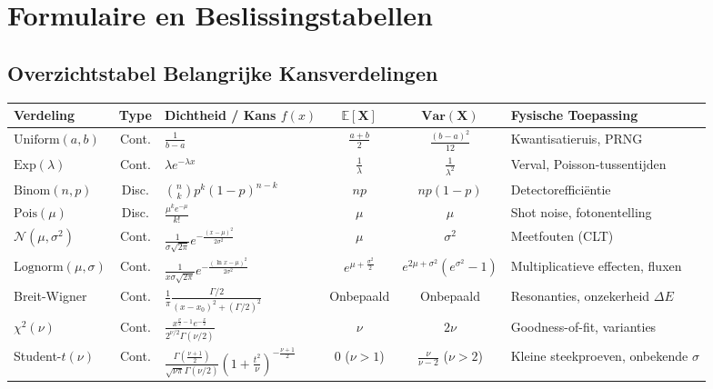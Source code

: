\documentclass[11pt,a4paper]{article}
\newcommand{\E}{\mathbb{E}}
\newcommand{\Var}{\text{Var}}
\newcommand{\normdist}{\mathcal{N}}
\begin{document}
\newpage
\appendix
\section{Formulaire en Beslissingstabellen}

\subsection{Overzichtstabel Belangrijke Kansverdelingen}
\begin{table}[H]
    \centering
    \footnotesize
    \begin{tabularx}{\textwidth}{lcp{3.8cm}ccX}
        \toprule
        \textbf{Verdeling} & \textbf{Type} & \textbf{Dichtheid / Kans $f(x)$} & $\mathbf{\E[X]}$ & $\mathbf{\Var(X)}$ & \textbf{Fysische Toepassing} \\
        \midrule
        $\text{Uniform}(a,b)$ & Cont. & $\frac{1}{b-a}$ & $\frac{a+b}{2}$ & $\frac{(b-a)^2}{12}$ & Kwantisatieruis, PRNG \\
        \addlinespace
        $\text{Exp}(\lambda)$ & Cont. & $\lambda e^{-\lambda x}$ & $\frac{1}{\lambda}$ & $\frac{1}{\lambda^2}$ & Verval, Poisson-tussentijden \\
        \addlinespace
        $\text{Binom}(n,p)$ & Disc. & $\binom{n}{k}p^k(1-p)^{n-k}$ & $np$ & $np(1-p)$ & Detectorefficiëntie \\
        \addlinespace
        $\text{Pois}(\mu)$ & Disc. & $\frac{\mu^k e^{-\mu}}{k!}$ & $\mu$ & $\mu$ & Shot noise, fotonentelling \\
        \addlinespace
        $\normdist(\mu,\sigma^2)$ & Cont. & $\frac{1}{\sigma\sqrt{2\pi}}e^{-\frac{(x-\mu)^2}{2\sigma^2}}$ & $\mu$ & $\sigma^2$ & Meetfouten (CLT) \\
        \addlinespace
        $\text{Lognorm}(\mu,\sigma)$ & Cont. & $\frac{1}{x\sigma\sqrt{2\pi}}e^{-\frac{(\ln x-\mu)^2}{2\sigma^2}}$ & $e^{\mu+\frac{\sigma^2}{2}}$ & $e^{2\mu+\sigma^2}(e^{\sigma^2}-1)$ & Multiplicatieve effecten, fluxen \\
        \addlinespace
        Breit-Wigner & Cont. & $\frac{1}{\pi}\frac{\Gamma/2}{(x-x_0)^2+(\Gamma/2)^2}$ & Onbepaald & Onbepaald & Resonanties, onzekerheid $\Delta E$ \\
        \addlinespace
        $\chi^2(\nu)$ & Cont. & $\frac{x^{\frac{\nu}{2}-1}e^{-\frac{x}{2}}}{2^{\nu/2}\Gamma(\nu/2)}$ & $\nu$ & $2\nu$ & Goodness-of-fit, varianties \\
        \addlinespace
        Student-$t(\nu)$ & Cont. & $\frac{\Gamma(\frac{\nu+1}{2})}{\sqrt{\nu\pi}\Gamma(\nu/2)}(1+\frac{t^2}{\nu})^{-\frac{\nu+1}{2}}$ & $0$ ($\nu>1$) & $\frac{\nu}{\nu-2}$ ($\nu>2$) & Kleine steekproeven, onbekende $\sigma$ \\
        \bottomrule
    \end{tabularx}
\end{table}
\end{document}
